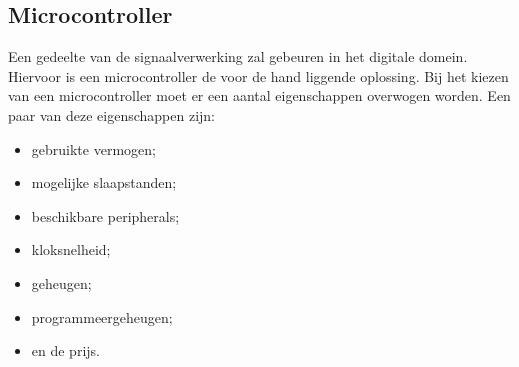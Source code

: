 \subsection{Microcontroller}
Een gedeelte van de signaalverwerking zal gebeuren in het digitale domein. Hiervoor is een microcontroller de voor de hand liggende oplossing. Bij het kiezen van een microcontroller moet er een aantal eigenschappen overwogen worden. Een paar van deze eigenschappen zijn:
\begin{itemize}
    \item gebruikte vermogen;
    \item mogelijke slaapstanden;
    \item beschikbare peripherals;
    \item kloksnelheid;
    \item geheugen;
    \item programmeergeheugen;
    \item en de prijs.
\end{itemize}

